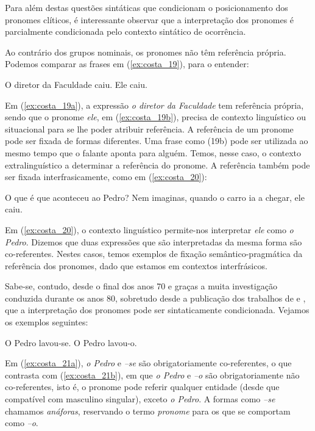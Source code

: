 \documentclass[output=paper]{LSP/langsci}
\begin{document}
Para além destas questões sintáticas que condicionam o posicionamento dos pronomes clíticos, é interessante observar que a interpretação dos pronomes é parcialmente condicionada pelo contexto sintático de ocorrência.

Ao contrário dos grupos nominais, os pronomes não têm referência própria. Podemos comparar as frases em (\ref{ex:costa_19}), para o entender:

\ea\label{ex:costa_19}
\ea\label{ex:costa_19a} O diretor da Faculdade caiu.
\ex\label{ex:costa_19b} Ele caiu.
\zl

Em (\ref{ex:costa_19a}), a expressão \textit{o diretor da Faculdade} tem referência própria, sendo que o pronome \textit{ele}, em (\ref{ex:costa_19b}), precisa de contexto linguístico ou situacional para se lhe poder atribuir referência. A referência de um pronome pode ser fixada de formas diferentes. Uma frase como (19b) pode ser utilizada ao mesmo tempo que o falante aponta para alguém. Temos, nesse caso, o contexto extralinguístico a determinar a referência do pronome. A referência também pode ser fixada interfrasicamente, como em (\ref{ex:costa_20}):

\ea\label{ex:costa_20}
\ea\label{ex:costa_20a} O que é que aconteceu ao Pedro?
\ex\label{ex:costa_20b} Nem imaginas, quando o carro ia a chegar, ele caiu.
\zl

Em (\ref{ex:costa_20}), o contexto linguístico permite-nos interpretar \textit{ele} como \textit{o Pedro}. Dizemos que duas expressões que são interpretadas da mesma forma são co-referentes. Nestes casos, temos exemplos de fixação semântico-pragmática da referência dos pronomes, dado que estamos em contextos interfrásicos.

Sabe-se, contudo, desde o final dos anos 70 e graças a muita investigação conduzida durante os anos 80, sobretudo desde a publicação dos trabalhos de \citet{reinhart1976} e \citet{chomsky1981}, que a interpretação dos pronomes pode ser sintaticamente condicionada. Vejamos os exemplos seguintes:

\ea\label{ex:costa_21}
\ea\label{ex:costa_21a} O Pedro lavou-se.
\ex\label{ex:costa_21b} O Pedro lavou-o.
\zl

Em (\ref{ex:costa_21a}), \textit{o Pedro} e \textit{–se} são obrigatoriamente co-referentes, o que contrasta com (\ref{ex:costa_21b}), em que \textit{o Pedro} e \textit{–o} são obrigatoriamente não co-referentes, isto é, o pronome pode referir qualquer entidade (desde que compatível com masculino singular), exceto \textit{o Pedro}. A formas como \textit{–se} chamamos \textit{anáforas}, reservando o termo \textit{pronome} para os que se comportam como \textit{–o}.
\end{document}
